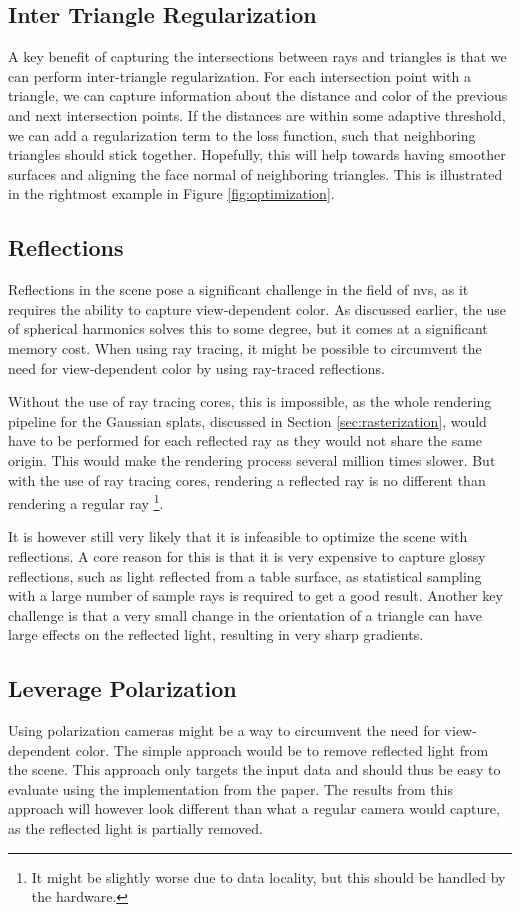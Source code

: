 \subsection{Inter Triangle Regularization}
A key benefit of capturing the intersections between rays and triangles is that we can perform inter-triangle regularization.
For each intersection point with a triangle, we can capture information about the distance and color of the previous and next intersection points.
If the distances are within some adaptive threshold, we can add a regularization term to the loss function, such that neighboring triangles should stick together.
Hopefully, this will help towards having smoother surfaces and aligning the face normal of neighboring triangles.
This is illustrated in the rightmost example in Figure \ref{fig:optimization}.

\subsection{Reflections}
Reflections in the scene pose a significant challenge in the field of \gls{nvs}, as it requires the ability to capture view-dependent color.
As discussed earlier, the use of spherical harmonics solves this to some degree, but it comes at a significant memory cost.
When using ray tracing, it might be possible to circumvent the need for view-dependent color by using ray-traced reflections.

Without the use of ray tracing cores, this is impossible, as the whole rendering pipeline for the Gaussian splats, discussed in Section \ref{sec:rasterization}, would have to be performed for each reflected ray as they would not share the same origin.
This would make the rendering process several million times slower.
But with the use of ray tracing cores, rendering a reflected ray is no different than rendering a regular ray \footnote{It might be slightly worse due to data locality, but this should be handled by the hardware.}.

It is however still very likely that it is infeasible to optimize the scene with reflections.
A core reason for this is that it is very expensive to capture glossy reflections, such as light reflected from a table surface, as statistical sampling with a large number of sample rays is required to get a good result.
Another key challenge is that a very small change in the orientation of a triangle can have large effects on the reflected light, resulting in very sharp gradients.


\subsection{Leverage Polarization}
Using polarization cameras might be a way to circumvent the need for view-dependent color.
The simple approach would be to remove reflected light from the scene.
This approach only targets the input data and should thus be easy to evaluate using the implementation from the paper.
The results from this approach will however look different than what a regular camera would capture, as the reflected light is partially removed.

